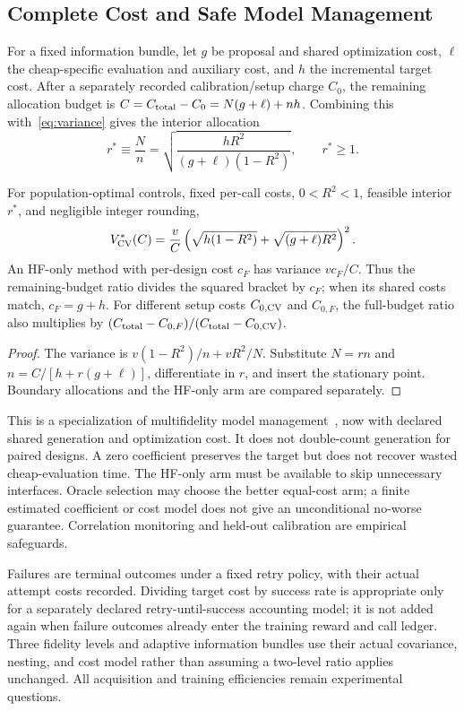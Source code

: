 \subsection{Complete Cost and Safe Model Management}
For a fixed information bundle, let $g$ be proposal and shared optimization cost, $\ell$ the cheap-specific evaluation and auxiliary cost, and $h$ the incremental target cost. After a separately recorded calibration/setup charge $C_0$, the remaining allocation budget is $C=C_{\rm total}-C_0=N(g+\ell)+nh$. Combining this with~\eqref{eq:variance} gives the interior allocation
\begin{equation}
r^*\equiv\frac Nn=\sqrt{\frac{hR^2}{(g+\ell)(1-R^2)}},\qquad r^*\ge1.
\label{eq:cost-ratio}
\end{equation}
\begin{proposition}
For population-optimal controls, fixed per-call costs, $0<R^2<1$, feasible interior $r^*$, and negligible integer rounding,
\begin{equation}
V^*_{\rm CV}(C)=\frac vC
\left(\sqrt{h(1-R^2)}+\sqrt{(g+\ell)R^2}\right)^2.
\label{eq:cost-variance}
\end{equation}
An HF-only method with per-design cost $c_F$ has variance $vc_F/C$. Thus the remaining-budget ratio divides the squared bracket by $c_F$; when its shared costs match, $c_F=g+h$. For different setup costs $C_{0,\rm CV}$ and $C_{0,F}$, the full-budget ratio also multiplies by $(C_{\rm total}-C_{0,F})/(C_{\rm total}-C_{0,\rm CV})$.
\end{proposition}
\begin{proof}
The variance is $v(1-R^2)/n+vR^2/N$. Substitute $N=rn$ and $n=C/[h+r(g+\ell)]$, differentiate in $r$, and insert the stationary point. Boundary allocations and the HF-only arm are compared separately.
\end{proof}

This is a specialization of multifidelity model management~\cite{peherstorfer2016optimal,liu2026mfpgppo}, now with declared shared generation and optimization cost. It does not double-count generation for paired designs. A zero coefficient preserves the target but does not recover wasted cheap-evaluation time. The HF-only arm must be available to skip unnecessary interfaces. Oracle selection may choose the better equal-cost arm; a finite estimated coefficient or cost model does not give an unconditional no-worse guarantee. Correlation monitoring and held-out calibration are empirical safeguards.

Failures are terminal outcomes under a fixed retry policy, with their actual attempt costs recorded. Dividing target cost by success rate is appropriate only for a separately declared retry-until-success accounting model; it is not added again when failure outcomes already enter the training reward and call ledger. Three fidelity levels and adaptive information bundles use their actual covariance, nesting, and cost model rather than assuming a two-level ratio applies unchanged. All acquisition and training efficiencies remain experimental questions.
